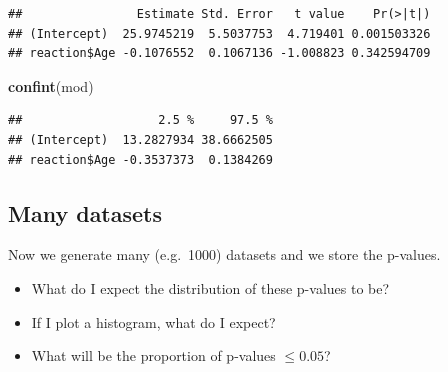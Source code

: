 \documentclass[]{article}
\newenvironment{Shaded}{\begin{snugshade}}{\end{snugshade}}
\newcommand{\KeywordTok}[1]{\textcolor[rgb]{0.13,0.29,0.53}{\textbf{#1}}}
\newcommand{\DecValTok}[1]{\textcolor[rgb]{0.00,0.00,0.81}{#1}}
\newcommand{\StringTok}[1]{\textcolor[rgb]{0.31,0.60,0.02}{#1}}
\newcommand{\CommentTok}[1]{\textcolor[rgb]{0.56,0.35,0.01}{\textit{#1}}}
\newcommand{\ControlFlowTok}[1]{\textcolor[rgb]{0.13,0.29,0.53}{\textbf{#1}}}
\newcommand{\OperatorTok}[1]{\textcolor[rgb]{0.81,0.36,0.00}{\textbf{#1}}}
\newcommand{\NormalTok}[1]{#1}
\providecommand{\tightlist}{%
  \setlength{\itemsep}{0pt}\setlength{\parskip}{0pt}}
\begin{document}
\begin{verbatim}
##                Estimate Std. Error   t value    Pr(>|t|)
## (Intercept)  25.9745219  5.5037753  4.719401 0.001503326
## reaction$Age -0.1076552  0.1067136 -1.008823 0.342594709
\end{verbatim}

\begin{Shaded}
\begin{Highlighting}[]
\KeywordTok{confint}\NormalTok{(mod)}
\end{Highlighting}
\end{Shaded}

\begin{verbatim}
##                   2.5 %     97.5 %
## (Intercept)  13.2827934 38.6662505
## reaction$Age -0.3537373  0.1384269
\end{verbatim}

\subsection{Many datasets}\label{many-datasets}

Now we generate many (e.g.~1000) datasets and we store the p-values.

\begin{Shaded}
\end{Shaded}

\begin{itemize}
\tightlist
\item
  What do I expect the distribution of these p-values to be?
\item
  If I plot a histogram, what do I expect?
\item
  What will be the proportion of p-values \(\leq 0.05\)?
\end{itemize}
\end{document}
